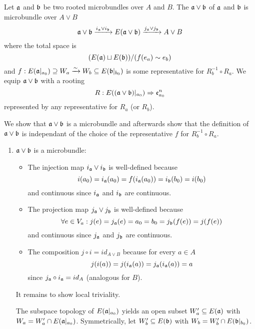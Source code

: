 \begin{mydefinition}
    Let $\mathfrak{a}$ and $\mathfrak{b}$ be two rooted microbundles over $A$ and $B$.
    The  $\mathfrak{a} \vee \mathfrak{b}$ of $\mathfrak{a}$ and $\mathfrak{b}$ is microbundle over $A \vee B$
    \[ \mathfrak{a} \vee \mathfrak{b} \xrightarrow{i_{\mathfrak{a}} \vee i_{\mathfrak{b}}} E(\mathfrak{a} \vee \mathfrak{b}) \xrightarrow{j_{\mathfrak{a}} \vee j_{\mathfrak{b}}} A \vee B \]
    where the total space is
    \[ (E(\mathfrak{a}) \sqcup E(\mathfrak{b})) / (f(e_a) \sim e_b) \]
    and $f: E(\mathfrak{a}\vert_{a_0}) \supseteq{} W_a \xrightarrow{\sim} W_b \subseteq{} E(\mathfrak{b}\vert_{b_0})$ is some representative for $R_b^{-1} \circ R_a$.
    We equip $\mathfrak{a} \vee \mathfrak{b}$ with a rooting
    \[ R: E((\mathfrak{a} \vee \mathfrak{b})\vert_{a_0}) \Rightarrow{} \mathfrak{e}^{n}_{a_0} \]
    represented by any representative for $R_a$ (or $R_b$).
\end{mydefinition}
\begin{myproof}
    We show that $\mathfrak{a} \vee \mathfrak{b}$ is a microbundle and afterwards show
    that the definition of $\mathfrak{a} \vee \mathfrak{b}$ is independant of the choice of the representative $f$ for $R_b^{-1} \circ R_a$.
    \begin{enumerate}
        \item $\mathfrak{a} \vee \mathfrak{b}$ is a microbundle:
        \begin{itemize}
            \item The injection map $i_{\mathfrak{a}} \vee i_{\mathfrak{b}}$ is well-defined because 
            \[ i(a_0) = i_{\mathfrak{a}}(a_0) = f(i_{\mathfrak{a}}(a_0)) = i_{\mathfrak{b}}(b_0) = i(b_0) \]
            and continuous since $i_{\mathfrak{a}}$ and $i_{\mathfrak{b}}$ are continuous.
            \item The projection map $j_{\mathfrak{a}} \vee j_{\mathfrak{b}}$ is well-defined because
            \[ \forall e \in V_a: j(e) = j_{\mathfrak{a}}(e) = a_0 = b_0 = j_{\mathfrak{b}}(f(e)) = j(f(e)) \]
            and continuous since $j_{\mathfrak{a}}$ and $j_{\mathfrak{b}}$ are continuous.
            \item The composition $j \circ i = id_{A \vee B}$ because for every $a \in A$
            \[ j(i(a)) = j(i_{\mathfrak{a}}(a)) = j_{\mathfrak{a}}(i_{\mathfrak{a}}(a)) = a \]
            since $j_{\mathfrak{a}} \circ i_{\mathfrak{a}} = id_A$ (analogous for $B$).
        \end{itemize}
        It remains to show local triviality.

        The subspace topology of $E(\mathfrak{a}\vert_{a_0})$ yields an open subset $W_a' \subseteq{} E(\mathfrak{a})$ with $W_a = W_a' \cap E(\mathfrak{a}\vert_{a_0})$.
        Symmetrically, let $W_b' \subseteq{} E(\mathfrak{b})$ with $W_b = W_b' \cap E(\mathfrak{b}\vert_{b_0})$.


\end{enumerate}
\end{myproof}
